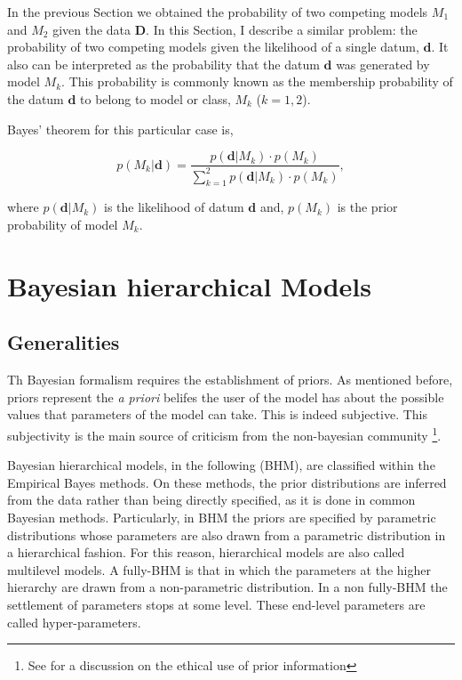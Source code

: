 In the previous Section we obtained the probability of two competing models $M_1$ and $M_2$ given the data $\mathbf{D}$. In this Section, I describe a similar problem: the probability of two competing models given the likelihood of a single datum, $\mathbf{d}$. It also can be interpreted as the probability that the datum $\mathbf{d}$ was generated by model $M_k$. This probability is commonly known as the membership probability of the datum $\mathbf{d}$ to belong to model or class, $M_k$ ($k=1,2$). 

Bayes' theorem for this particular case is,

\begin{equation}
\label{eq:prob}
p( M_k | \mathbf{d}) =\frac{p(\mathbf{d}|M_k)\cdot p(M_k)}{\sum_{k=1}^2 p(\mathbf{d}|M_k)\cdot p(M_k)},
\end{equation}

where $p(\mathbf{d}|M_k)$ is the likelihood of datum $\mathbf{d}$ and, $p(M_k)$ is the prior probability of model $M_k$.
\section{Bayesian hierarchical Models}
\label{sect:BHM}
\subsection{Generalities}
Th Bayesian formalism requires the establishment of priors. As mentioned before, priors represent the \emph{a priori} belifes the user of the model has about the possible values that parameters of the model can take. This is indeed subjective. This subjectivity is the main source of criticism from the non-bayesian community \footnote{See \citet{Gelman2012} for a discussion on the ethical use of prior information}. 

Bayesian hierarchical models, in the following (BHM), are classified within the Empirical Bayes methods. On these methods, the prior distributions are inferred from the data rather than being directly specified, as it is done in common Bayesian methods. Particularly, in BHM the priors are specified by parametric distributions whose parameters are also drawn from a parametric distribution in a hierarchical fashion. For this reason, hierarchical models are also called multilevel models. A fully-BHM is that in which the parameters at the higher hierarchy are drawn from a non-parametric distribution. In a non fully-BHM the settlement of parameters stops at some level. These end-level parameters are called hyper-parameters.


